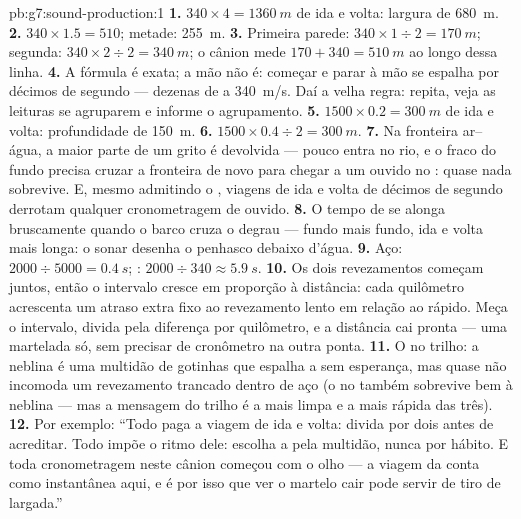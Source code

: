 \begin{solution}{pb:g7:sound-production:1}
\textbf{1.} $340 \times 4 = \qty{1360}{m}$ de ida e volta: largura de
\qty{680}{m}.
\textbf{2.} $340 \times 1.5 = 510$; metade: \qty{255}{m}.
\textbf{3.} Primeira parede: $340 \times 1 \div 2 = \qty{170}{m}$;
segunda: $340 \times 2 \div 2 = \qty{340}{m}$; o cânion mede
$170 + 340 = \qty{510}{m}$ ao longo dessa linha.
\textbf{4.} A fórmula é exata; a mão não é: começar e parar à mão se
espalha por décimos de segundo --- dezenas de  a
\qty{340}{m/s}. Daí a velha regra: repita, veja as leituras se
agruparem e informe o agrupamento.
\textbf{5.} $1500 \times 0.2 = \qty{300}{m}$ de ida e volta:
profundidade de \qty{150}{m}.
\textbf{6.} $1500 \times 0.4 \div 2 = \qty{300}{m}$.
\textbf{7.} Na fronteira ar--água, a maior parte de um grito é
devolvida --- pouco entra no rio, e o  fraco do fundo precisa
cruzar a fronteira de novo para chegar a um ouvido no : quase nada
sobrevive. E, mesmo admitindo o , viagens de ida e volta de
décimos de segundo derrotam qualquer cronometragem de ouvido.
\textbf{8.} O tempo de  se alonga bruscamente quando o barco cruza
o degrau --- fundo mais fundo, ida e volta mais longa: o sonar
desenha o penhasco debaixo d'água.
\textbf{9.} Aço: $2000 \div 5000 = \qty{0.4}{s}$; :
$2000 \div 340 \approx \qty{5.9}{s}$.
\textbf{10.} Os dois revezamentos começam juntos, então o intervalo
cresce em proporção à distância: cada quilômetro acrescenta um atraso
extra fixo ao revezamento lento em relação ao rápido. Meça o
intervalo, divida pela diferença por quilômetro, e a distância cai
pronta --- uma martelada só, sem precisar de cronômetro na outra
ponta.
\textbf{11.} O  no trilho: a neblina é uma multidão de gotinhas
que espalha a \emph{} sem esperança, mas quase não incomoda um
revezamento trancado dentro de aço  (o  no  também
sobrevive bem à neblina --- mas a mensagem do trilho é a mais limpa e
a mais rápida das três).
\textbf{12.} Por exemplo: ``Todo  paga a viagem de ida e volta:
divida por dois antes de acreditar. Todo  impõe o ritmo dele:
escolha a  pela multidão, nunca por hábito. E toda
cronometragem neste cânion começou com o olho --- a viagem da 
conta como instantânea aqui, e é por isso que ver o martelo cair pode
servir de tiro de largada.''
\end{solution}
